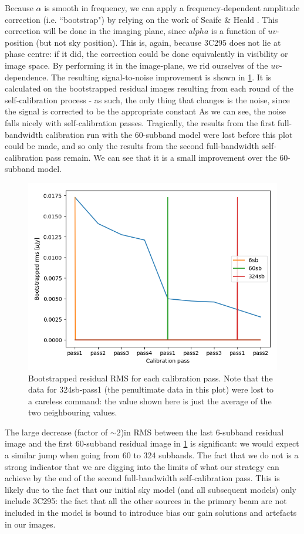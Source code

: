 \pg
Because $\alpha$ is smooth in frequency, we can apply a frequency-dependent amplitude correction (i.e. ``bootstrap") by relying on the work of Scaife \& Heald \citep[see][]{arse}. This correction will be done in the imaging plane, since $alpha$ is a function of $uv$-position (but not sky position). This is, again, because 3C295 does not lie at phase centre: if it did, the correction could be done equivalently in visibility or image space. By performing it in the image-plane, we rid ourselves of the $uv$-dependence. The resulting signal-to-noise improvement is shown in \cref{fig.SCrms}. It is calculated on the bootstrapped residual images resulting from each round of the self-calibration process - as such, the only thing that changes is the noise, since the signal is corrected to be the appropriate constant As we can see, the noise falls nicely with self-calibration passes. Tragically, the results from the first full-bandwidth calibration run with the 60-subband model were lost before this plot could be made, and so only the results from the second full-bandwidth self-calibration pass remain. We can see that it is a small improvement over the 60-subband model. 
\begin{figure}[h]
\includegraphics[width=0.8\linewidth]{images/SCrms.png}
\caption{\label{fig.SCrms} Bootstrapped residual RMS for each calibration pass. Note that the data for 324sb-pass1 (the penultimate data in this plot) were lost to a careless command: the value shown here is just the average of the two neighbouring values.}
\end{figure}

\pg
The large decrease (factor of $\sim2$)in RMS between the last 6-subband residual image and the first 60-subband residual image in \cref{fig.SCrms} is significant: we would expect a similar jump when going from 60 to 324 subbands. The fact that we do not is a strong indicator that we are digging into the limits of what our strategy can achieve by the end of the second full-bandwidth self-calibration pass. This is likely due to the fact that our initial sky model (and all subsequent models) only include 3C295: the fact that all the other sources in the primary beam are not included in the model is bound to introduce bias our gain solutions and artefacts in our images. 

